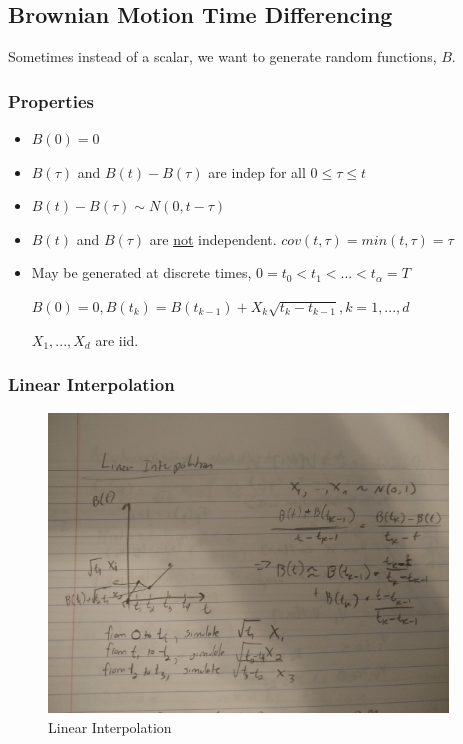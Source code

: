 \documentclass[11pt]{article}
\begin{document}
\subsection{Brownian Motion Time Differencing}
\label{sec:orgba81177}

Sometimes instead of a scalar, we want to generate random functions, \(B\).

\subsubsection{Properties}
\label{sec:orga2693a8}
\begin{itemize}
\item \(B(0) = 0\)
\item \(B(\tau)\) and \(B(t) - B(\tau)\) are indep for all \(0 \leq \tau \leq t\)
\item \(B(t) - B(\tau) \sim N(0, t - \tau)\)
\item \(B(t)\) and \(B(\tau)\) are \uline{not} independent.
\(cov(t, \tau) = min(t, \tau) = \tau\)
\item May be generated at discrete times, \(0 = t_0 < t_1 < ... < t_\alpha = T\)

\(B(0) = 0, B(t_k) = B(t_{k - 1}) + X_k \sqrt{t_k - t_{k - 1}}, k = 1,...,d\)

\(X_1,...,X_d\) are iid.
\end{itemize}

\subsubsection{Linear Interpolation}
\label{sec:org394ef50}

\begin{figure}[htbp]
\centering
\includegraphics[width=10.6cm,height=7cm\textwidth]{./resources/linear_interpolation.jpg}
\caption{\label{fig:org4ba9163}Linear Interpolation}
\end{figure}
\end{document}
